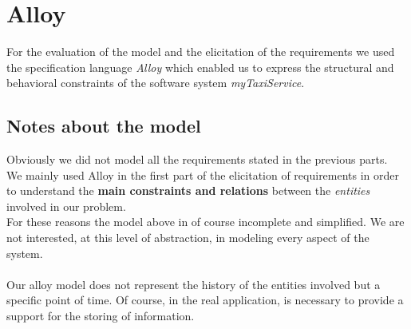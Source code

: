\section{Alloy}
For the evaluation of the model and the elicitation of the requirements we used the specification language \textit{Alloy} which enabled us to express the structural and behavioral constraints of the software system \textit{myTaxiService}.



\subsection{Notes about the model}
Obviously we did not model all the requirements stated in the previous parts.\\
We mainly used Alloy in the first part of the elicitation of requirements in order to understand the \textbf{main constraints and relations} between the \textit{entities} involved in our problem.\\
For these reasons the model above in of course incomplete and simplified. We are not interested, at this level of abstraction, in modeling every aspect of the system.\\
\\
Our alloy model does not represent the history of the entities involved but a specific point of time. Of course, in the real application, is necessary to provide a support for the storing of information.
